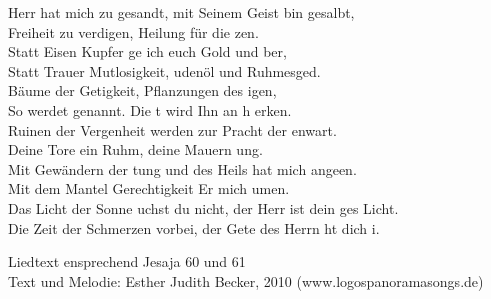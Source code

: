 
 Herr hat mich zu  gesandt, mit Seinem Geist bin  gesalbt,\\
Freiheit zu verdigen, Heilung für die zen.\\
Statt Eisen  Kupfer ge ich euch Gold und ber,\\
Statt Trauer  Mutlosigkeit, udenöl und Ruhmesged.\\
Bäume der Getigkeit, Pflanzungen des igen,\\
So werdet  genannt. Die t wird Ihn an h erken.\\

 Ruinen der Vergenheit werden zur Pracht der enwart.\\
Deine Tore  ein Ruhm, deine Mauern ung.\\
Mit Gewändern der tung und des Heils hat  mich angeen.\\
Mit dem Mantel  Gerechtigkeit  Er mich umen.\\ 
Das Licht der Sonne uchst du nicht, der Herr ist dein ges Licht.\\
Die Zeit der Schmerzen  vorbei, der Gete des Herrn ht dich i.\\

\begin{footnotesize}
Liedtext ensprechend Jesaja 60 und 61\\
Text und Melodie: Esther Judith Becker, 2010 (www.logospanoramasongs.de)
\end{footnotesize}